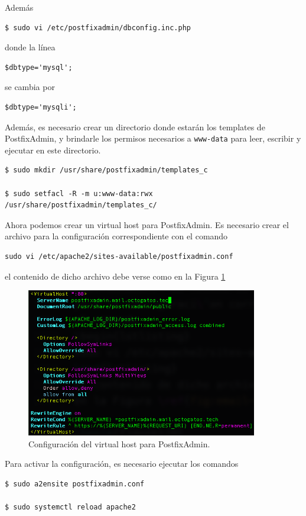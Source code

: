 \documentclass{article}
\newcommand{\ttt}[1]{%
\texttt{#1}%
}
\begin{document}
Adem\'as
\begin{lstlisting}
$ sudo vi /etc/postfixadmin/dbconfig.inc.php
\end{lstlisting}
donde la l\'inea
\begin{lstlisting}
$dbtype='mysql';
\end{lstlisting}
se cambia por \begin{lstlisting}
$dbtype='mysqli';
\end{lstlisting}

Adem\'as, es necesario crear un directorio
donde estar\'an los templates de PostfixAdmin,
y brindarle los permisos necesarios a
\ttt{www-data} para leer, escribir y ejecutar
en este directorio.
\begin{lstlisting}
$ sudo mkdir /usr/share/postfixadmin/templates_c

$ sudo setfacl -R -m u:www-data:rwx /usr/share/postfixadmin/templates_c/
\end{lstlisting}

Ahora podemos crear un virtual host para
PostfixAdmin.  Es necesario crear el archivo
para la configuraci\'on correspondiente con
el comando
\begin{lstlisting}
sudo vi /etc/apache2/sites-available/postfixadmin.conf
\end{lstlisting}
el contenido de dicho archivo debe verse como
en la Figura \ref{fig:email-vhost}

\begin{figure}[H]
  \centering
  \includegraphics[width=0.9\textwidth]{email/vhost}
  \caption{Configuraci\'on del virtual host para PostfixAdmin.}
  \label{fig:email-vhost}
\end{figure}

Para activar la configuraci\'on, es necesario
ejecutar los comandos
\begin{lstlisting}
$ sudo a2ensite postfixadmin.conf

$ sudo systemctl reload apache2
\end{lstlisting}
\end{document}
